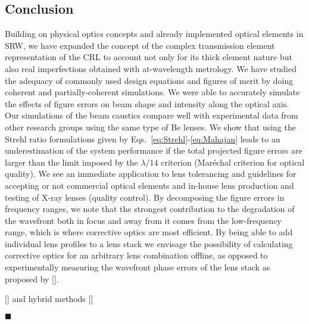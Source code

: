 \begin{refsection}
\chapter{Conclusion}
\label{sec:conclusion}

Building on physical optics concepts and already implemented optical elements in SRW, we have expanded the concept of the complex transmission element representation of the CRL to account not only for its thick element nature but also real imperfections obtained with at-wavelength metrology. We have studied the adequacy of commonly used design equations and figures of merit by doing coherent and partially-coherent simulations. We were able to accurately simulate the effects of figure errors on beam shape and intensity along the optical axis. Our simulations of the beam caustics compare well with experimental data from other research groups using the same type of Be lenses. We show that using the Strehl ratio formulations given by Eqs.~\ref{eq:Strehl}-\ref{eq:Mahajan} leads to an underestimation of the system performance if the total projected figure errors are larger than the limit imposed by the $\lambda/14$ criterion (Mar\'echal criterion for optical quality). We see an immediate application to lens tolerancing and guidelines for accepting or not commercial optical elements and in-house lens production and testing of X-ray lenses (quality control). By decomposing the figure errors in frequency ranges, we note that the strongest contribution to the degradation of the wavefront both in focus and away from it comes from the low-frequency range, which is where corrective optics are most efficient. By being able to add individual lens profiles to a lens stack we envisage the possibility of calculating corrective optics for an arbitrary lens combination offline, as opposed to experimentally measuring the wavefront phase errors of the lens stack as proposed by [\cite{Seiboth2017}]. 

[\cite{SanchezdelRio2011}] and hybrid methods [\cite{Shi2014}]

$\blacksquare$
\printbibliography[heading=subbibliography]
\end{refsection}